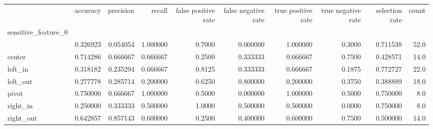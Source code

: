 \begin{tabular}{lrrrrrrrrr}
\toprule
{} &  accuracy &  precision &    recall &  false positive rate &  false negative rate &  true positive rate &  true negative rate &  selection rate &  count \\
sensitive\_feature\_0 &           &            &           &                      &                      &                     &                     &                 &        \\
\midrule
                    &  0.326923 &   0.054054 &  1.000000 &               0.7000 &             0.000000 &            1.000000 &              0.3000 &        0.711538 &   52.0 \\
center              &  0.714286 &   0.666667 &  0.666667 &               0.2500 &             0.333333 &            0.666667 &              0.7500 &        0.428571 &   14.0 \\
left\_in             &  0.318182 &   0.235294 &  0.666667 &               0.8125 &             0.333333 &            0.666667 &              0.1875 &        0.772727 &   22.0 \\
left\_out            &  0.277778 &   0.285714 &  0.200000 &               0.6250 &             0.800000 &            0.200000 &              0.3750 &        0.388889 &   18.0 \\
pivot               &  0.750000 &   0.666667 &  1.000000 &               0.5000 &             0.000000 &            1.000000 &              0.5000 &        0.750000 &    8.0 \\
right\_in            &  0.250000 &   0.333333 &  0.500000 &               1.0000 &             0.500000 &            0.500000 &              0.0000 &        0.750000 &    8.0 \\
right\_out           &  0.642857 &   0.857143 &  0.600000 &               0.2500 &             0.400000 &            0.600000 &              0.7500 &        0.500000 &   14.0 \\
\bottomrule
\end{tabular}
